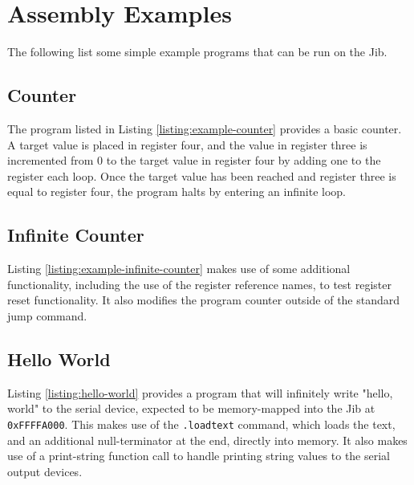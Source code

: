 \documentclass{article}
\begin{document}
\pagebreak

\section{Assembly Examples}

The following list some simple example programs that can be run on the Jib.

\subsection{Counter}

The program listed in Listing \ref{listing:example-counter} provides a basic counter. A target value is placed in register four, and the value in register three is incremented from 0 to the target value in register four by adding one to the register each loop. Once the target value has been reached and register three is equal to register four, the program halts by entering an infinite loop.



\subsection{Infinite Counter}

Listing \ref{listing:example-infinite-counter} makes use of some additional functionality, including the use of the register reference names, to test register reset functionality. It also modifies the program counter outside of the standard jump command.



\subsection{Hello World}

Listing  \ref{listing:hello-world} provides a program that will infinitely write "hello, world" to the serial device, expected to be memory-mapped into the Jib at \texttt{0xFFFFA000}. This makes use of the \texttt{.loadtext} command, which loads the text, and an additional null-terminator at the end, directly into memory. It also makes use of a print-string function call to handle printing string values to the serial output devices.
\end{document}
